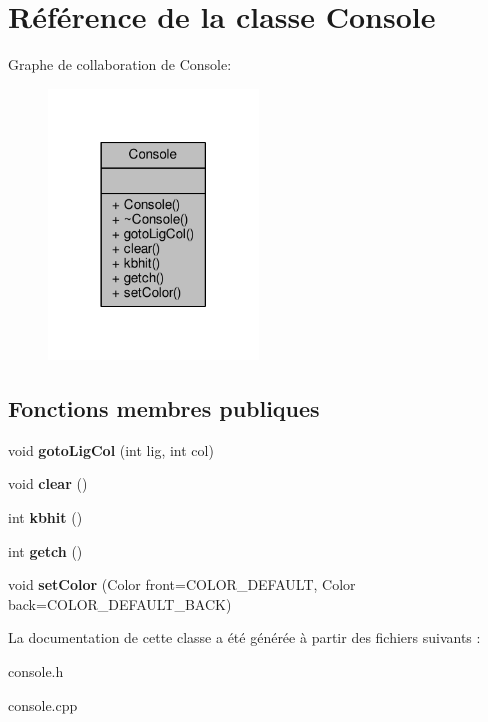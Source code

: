 \hypertarget{classConsole}{}\section{Référence de la classe Console}
\label{classConsole}


Graphe de collaboration de Console\+:\nopagebreak
\begin{figure}[H]
\begin{center}
\leavevmode
\includegraphics[width=158pt]{classConsole__coll__graph}
\end{center}
\end{figure}
\subsection*{Fonctions membres publiques}
\begin{DoxyCompactItemize}
\item 
void {\bfseries goto\+Lig\+Col} (int lig, int col)\hypertarget{classConsole_acfa13c1ba733eaa7de5182ca14a54ce1}{}\label{classConsole_acfa13c1ba733eaa7de5182ca14a54ce1}

\item 
void {\bfseries clear} ()\hypertarget{classConsole_a8b4ffaeabbea48e1f3aa1e535ee88ab8}{}\label{classConsole_a8b4ffaeabbea48e1f3aa1e535ee88ab8}

\item 
int {\bfseries kbhit} ()\hypertarget{classConsole_aae56ae7e713cb582fff7be7dd1b9f034}{}\label{classConsole_aae56ae7e713cb582fff7be7dd1b9f034}

\item 
int {\bfseries getch} ()\hypertarget{classConsole_a0fd1fe1bdd711540991cc8a19f994201}{}\label{classConsole_a0fd1fe1bdd711540991cc8a19f994201}

\item 
void {\bfseries set\+Color} (Color front=C\+O\+L\+O\+R\+\_\+\+D\+E\+F\+A\+U\+LT, Color back=C\+O\+L\+O\+R\+\_\+\+D\+E\+F\+A\+U\+L\+T\+\_\+\+B\+A\+CK)\hypertarget{classConsole_a0863977db7f233075ba98febdbcf3218}{}\label{classConsole_a0863977db7f233075ba98febdbcf3218}

\end{DoxyCompactItemize}


La documentation de cette classe a été générée à partir des fichiers suivants \+:\begin{DoxyCompactItemize}
\item 
console.\+h\item 
console.\+cpp\end{DoxyCompactItemize}
